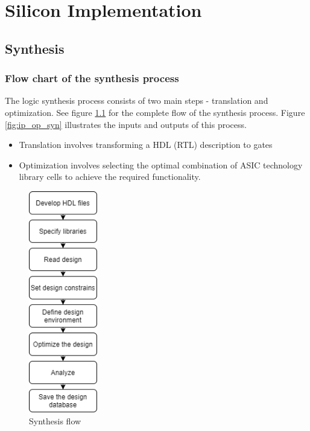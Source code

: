 \documentclass[../main.tex]{subfiles}
\begin{document}
\chapter{Silicon Implementation}
\section{Synthesis}

\subsection{Flow chart of the synthesis process}
The logic synthesis process consists of two main steps - translation and 
optimization. See figure \ref{fig:syn_flow} for the complete flow of the synthesis process. Figure \ref{fig:ip_op_syn} illustrates the inputs and outputs of this process.

\begin{itemize}
\item Translation involves transforming a HDL (RTL) description to gates
\item Optimization involves selecting the optimal combination of ASIC technology library cells to achieve the required functionality.
\end{itemize}

\begin{figure}[h]
    \centering
    \includegraphics[width=3cm]{diagrams/syn_flow.png}
    \caption{Synthesis flow}
    \label{fig:syn_flow}
\end{figure}
\end{document}
